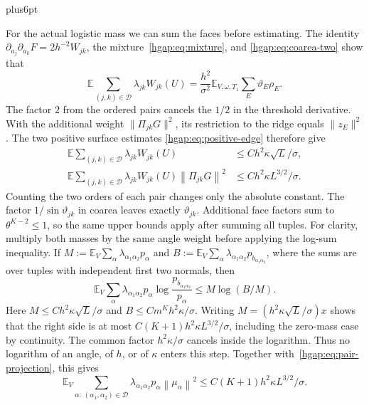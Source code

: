 \documentclass[11pt,letterpaper,twoside,leqno]{article}
\makeatletter
\theoremstyle{bookplain}
\theoremstyle{bookremark}
\renewenvironment{proof}[1][\proofname]{\par
  \pushQED{\qed}\normalfont\topsep6pt plus6pt\relax
  \trivlist\item[\hskip\labelsep\bfseries #1\@addpunct{.}]\ignorespaces
}{\popQED\endtrivlist\@endpefalse}
\newcommand{\E}{\mathbb E}
\newcommand{\cD}{\mathcal D}
\newcommand{\norm}[1]{\left\lVert#1\right\rVert}
\makeatother
\begin{document}
\begin{proof}
For the actual logistic mass we can sum the faces before estimating.
The identity $\partial_{a_j}\partial_{a_k}F=2h^{-2}W_{jk}$,
the mixture~\eqref{hgap:eq:mixture}, and
\eqref{hgap:eq:coarea-two} show that
\[
 \E\sum_{(j,k)\in\cD}\lambda_{jk}W_{jk}(U)
 =\frac{h^2}{\sigma^2}
       \E_{V,\omega,T_1}\sum_E\vartheta_E\rho_E.
\]
The factor $2$ from the ordered pairs cancels the $1/2$ in the
threshold derivative. With the additional weight
$\|\Pi_{jk}G\|^2$, its restriction to the ridge equals
$\|z_E\|^2$. The two positive surface estimates
\eqref{hgap:eq:positive-edge} therefore give
\begin{align}
 \E\sum_{(j,k)\in\cD}\lambda_{jk}W_{jk}(U)
   &\le C h^2\kappa\sqrt L/\sigma,\label{hgap:eq:pair-mass}\\
 \E\sum_{(j,k)\in\cD}\lambda_{jk}W_{jk}(U)\norm{\Pi_{jk}G}^2
   &\le C h^2\kappa L^{3/2}/\sigma.\label{hgap:eq:pair-projection}
\end{align}
Counting the two orders of each pair changes only the absolute constant.
The factor $1/\sin\vartheta_{jk}$ in coarea leaves exactly
$\vartheta_{jk}$. Additional face factors sum to $\theta^{K-2}\le1$,
so the same upper bounds apply after summing all tuples.
For clarity, multiply both masses by the same angle weight before
applying the log-sum inequality. If
$M:=\E_V\sum_\alpha\lambda_{\alpha_1\alpha_2}p_\alpha$ and
$B:=\E_V\sum_\alpha\lambda_{\alpha_1\alpha_2}p_{b_{\alpha_1\alpha_2}}$,
where the sums are over tuples with independent first two normals, then
\[
 \E_V\sum_\alpha\lambda_{\alpha_1\alpha_2}p_\alpha
       \log\frac{p_{b_{\alpha_1\alpha_2}}}{p_\alpha}
 \le M\log(B/M).
\]
Here $M\le Ch^2\kappa\sqrt L/\sigma$ and
$B\le Cm^Kh^2\kappa/\sigma$. Writing
$M=(h^2\kappa\sqrt L/\sigma)x$ shows that the right side is at most
$C(K+1)h^2\kappa L^{3/2}/\sigma$, including the zero-mass case by
continuity. The common factor $h^2\kappa/\sigma$ cancels inside the
logarithm. Thus no logarithm of an angle, of $h$, or of $\kappa$ enters
this step.
Together with~\eqref{hgap:eq:pair-projection}, this gives
\begin{equation}
 \E_V\sum_{\alpha:\,(\alpha_1,\alpha_2)\in\cD}
 \lambda_{\alpha_1\alpha_2}p_\alpha\norm{\mu_\alpha}^2
 \le C(K+1)h^2\kappa L^{3/2}/\sigma.
 \label{hgap:eq:pair-means}
\end{equation}


\end{proof}
\end{document}
